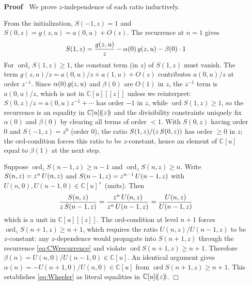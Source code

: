 \documentclass{article}
\newcommand{\tmop}[1]{\ensuremath{\operatorname{#1}}}
\newcommand{\tmtextbf}[1]{\text{{\bfseries{#1}}}}
\newenvironment{proof}{\noindent\textbf{Proof\ }}{\hspace*{\fill}$\Box$\medskip}
\newcommand{\ord}{\tmop{ord}}
\newcommand{\C}{\mathbb{C}}
\begin{document}
\begin{proof}
  We prove $z$-independence of each ratio inductively.
  
  \tmtextbf{Base case.} From the initialization, $S (- 1, z) = 1$ and $S (0,
  z) = g (z, u) = a (0, u) + O (z)$. The recurrence at $n = 1$ gives
  \begin{equation}
    S (1, z) = \frac{g (z, u)}{z} - \alpha (0)  \hspace{0.17em} g (z, u) -
    \beta (0) \cdot 1
  \end{equation}
  For $\ord_z S (1, z) \ge 1$, the constant term (in $z$) of $S (1, z)$ must
  vanish. The term $g (z, u) / z = a (0, u) / z + a (1, u) + O (z)$
  contributes $a (0, u) / z$ at order $z^{- 1}$. Since $\alpha (0) 
  \hspace{0.17em} g (z, u)$ and $\beta (0)$ are $O (1)$ in $z$, the $z^{- 1}$
  term is $a (0, u) / z$, which is not in $\C [u] [[z]]$ unless we
  reinterpret: $S (0, z) / z = a (0, u) z^{- 1} + \cdots$ has order $- 1$ in
  $z$, while $\ord S (1, z) \ge 1$, so the recurrence is an equality in $\C
  [u] (\hspace{-0.17em} (z) \hspace{-0.17em})$ and the divisibility
  constraints uniquely fix $\alpha (0)$ and $\beta (0)$ by clearing all terms
  of order $< 1$. With $S (0, z)$ having order $0$ and $S (- 1, z) = z^0$
  (order $0$), the ratio $S (1, z) / (z \hspace{0.17em} S (0, z))$ has order
  $\ge 0$ in $z$; the ord-condition forces this ratio to be $z$-constant,
  hence an element of $\C [u]$ equal to $\beta (1)$ at the next step.
  
  \tmtextbf{Inductive step.} Suppose $\ord_z S (n - 1, z) \ge n - 1$ and
  $\ord_z S (n, z) \ge n$. Write $S (n, z) = z^n  \hspace{0.17em} U (n, z)$
  and $S (n - 1, z) = z^{n - 1}  \hspace{0.17em} U (n - 1, z)$ with $U (n, 0),
  U (n - 1, 0) \in \C [u]^{\times}$ (units). Then
  \begin{equation}
    \frac{S (n, z)}{z \hspace{0.17em} S (n - 1, z)} = \frac{z^n 
    \hspace{0.17em} U (n, z)}{z^n  \hspace{0.17em} U (n - 1, z)} = \frac{U (n,
    z)}{U (n - 1, z)}
  \end{equation}
  which is a unit in $\C [u] [[z]]$. The ord-condition at level $n + 1$ forces
  $\ord_z S (n + 1, z) \ge n + 1$, which requires the ratio $U (n, z) / U (n -
  1, z)$ to be $z$-constant: any $z$-dependence would propagate into $S (n +
  1, z)$ through the recurrence \eqref{eq:CWrecurrence} and violate $\ord S (n
  + 1, z) \ge n + 1$. Therefore $\beta (n) = U (n, 0) / U (n - 1, 0) \in \C
  [u]$. An identical argument gives $\alpha (n) = - U (n + 1, 0) / U (n, 0)
  \in \C [u]$ from $\ord S (n + 1, z) \ge n + 1$. This establishes
  \eqref{eq:Wheeler} as literal equalities in $\C [u] (\hspace{-0.17em} (z)
  \hspace{-0.17em})$.
\end{proof}
\end{document}
